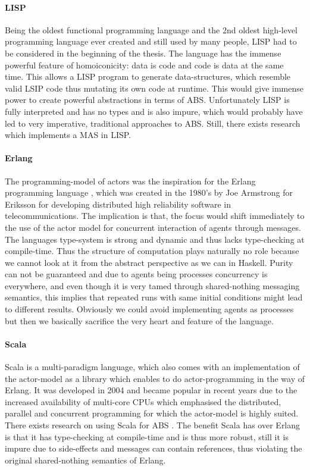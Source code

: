 \paragraph{LISP} Being the oldest functional programming language and the 2nd oldest high-level programming language ever created and still used by many people, LISP had to be considered in the beginning of the thesis. The language has the immense powerful feature of homoiconicity: data is code and code is data at the same time. This allows a LISP program to generate data-structures, which resemble valid LSIP code thus mutating its own code at runtime. This would give immense power to create powerful abstractions in terms of ABS. Unfortunately LISP is fully interpreted and has no types and is also impure, which would probably have led to very imperative, traditional approaches to ABS. Still, there exists research \cite{kawabe_nepi2programming_2000} which implements a MAS in LISP.

\paragraph{Erlang} The programming-model of actors \cite{agha_actors:_1986} was the inspiration for the Erlang programming language \cite{armstrong_erlang_2010}, which was created in the 1980's by Joe Armstrong for Eriksson for developing distributed high reliability software in telecommunications. The implication is that, the focus would shift immediately to the use of the actor model for concurrent interaction of agents through messages. The languages type-system is strong and dynamic and thus lacks type-checking at compile-time. Thus the structure of computation plays naturally no role because we cannot look at it from the abstract perspective as we can in Haskell. Purity can not be guaranteed and due to agents being processes concurrency is everywhere, and even though it is very tamed through shared-nothing messaging semantics, this implies that repeated runs with same initial conditions might lead to different results. Obviously we could avoid implementing agents as processes but then we basically sacrifice the very heart and feature of the language.
	
\paragraph{Scala} Scala is a multi-paradigm language, which also comes with an implementation of the actor-model as a library which enables to do actor-programming in the way of Erlang. It was developed in 2004 and became popular in recent years due to the increased availability of multi-core CPUs which emphasised the distributed, parallel and concurrent programming for which the actor-model is highly suited. There exists research on using Scala for ABS \cite{krzywicki_massively_2015, todd_multi-agent_nodate}. The benefit Scala has over Erlang is that it has type-checking at compile-time and is thus more robust, still it is impure due to side-effects and messages can contain references, thus violating the original shared-nothing semantics of Erlang.

